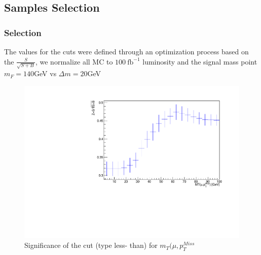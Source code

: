 \documentclass{beamer}
\begin{document}
\begin{frame}
\begin{figure}[!h]
\begin{subfigure}[b]{0.44\textwidth}
		\caption{\label{HT}}
	\end{subfigure}
	\caption{  }
\end{figure}


\end{frame}


\begin{frame}
\section{Samples Selection}
\frametitle{Selection}
The values for the cuts were defined through an optimization process based on the $\frac{S}{\sqrt{S+B}}$, we normalize all MC to $100~\text{fb}^{-1}$ luminosity and the
signal mass point  $m_{F}=140$GeV vs  $\Delta m=20$GeV



\begin{figure}[!h]
	
	\centering
	\includegraphics[scale=0.45]{pictures/Selection/SigLT_MT}
	\caption{Significance of the cut (type less-
		than) for $m_T(\mu,p_{T}^{Miss}$ \label{}}
	
\end{figure}


\end{frame}
\end{document}
